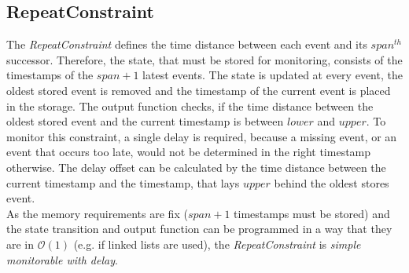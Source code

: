 \subsection{RepeatConstraint}
	The \emph{RepeatConstraint} defines the time distance between each event and its $span^{th}$ successor. Therefore, the state, that must be stored for monitoring, consists of the timestamps of the $span+1$ latest events. The state is updated at every event, the oldest stored event is removed and the timestamp of the current event is placed in the storage. The output function checks, if the time distance between the oldest stored event and the current timestamp is between $lower$ and $upper$. To monitor this constraint, a single delay is required, because a missing event, or an event that occurs too late, would not be determined in the right timestamp otherwise. The delay offset can be calculated by the time distance between the current timestamp and the timestamp, that lays $upper$ behind the oldest stores event.\\
	As the memory requirements are fix ($span+1$ timestamps must be stored) and the state transition and output function can be programmed in a way that they are in  $\mathcal O(1)$ (e.g. if linked lists are used), the \emph{RepeatConstraint} is \textit{simple monitorable with delay}.

